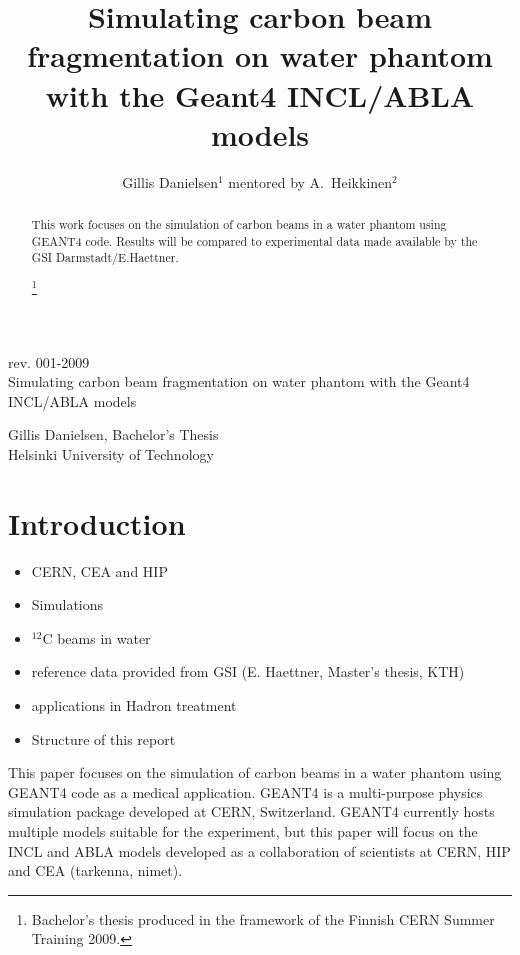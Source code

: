 \title{Simulating carbon beam fragmentation on water phantom with the Geant4 INCL/ABLA models}


\author{Gillis Danielsen$^1$ mentored by A.~Heikkinen$^2$} 
\begin{titlepage}
\pagestyle{empty}
\begin{center}
rev. 001-2009\\
\vspace{7.5 cm}
\Huge
Simulating carbon beam fragmentation on water phantom with the Geant4 INCL/ABLA models\\

\vspace{5cm}

\Large
Gillis Danielsen, Bachelor's Thesis\\
Helsinki University of Technology\\

    \vspace{0,2cm}
  \end{center}

\end{titlepage}


\begin{abstract}
This work focuses on the simulation of carbon beams in a water phantom using GEANT4 code. Results will be compared to experimental data made available by the GSI Darmstadt/E.Haettner.

\footnote{Bachelor's thesis produced in the framework of the Finnish CERN Summer Training 2009.}
\end{abstract}
\maketitle
\thispagestyle{fancy}

\tableofcontents

\section{Introduction}
\begin{itemize}
\item CERN, CEA and HIP
\item Simulations
\item $^{12}$C beams in water
\item reference data provided from GSI (E. Haettner, Master's thesis, KTH)
\item applications in Hadron treatment
\item Structure of this report
\end{itemize}
This paper focuses on the simulation of carbon beams in a water phantom using GEANT4 code as a medical application. GEANT4 is a multi-purpose physics simulation package developed at CERN, Switzerland. GEANT4 currently hosts multiple models suitable for the experiment, but this paper will focus on the INCL and ABLA models developed as a collaboration of scientists at CERN, HIP and CEA (tarkenna, nimet).


